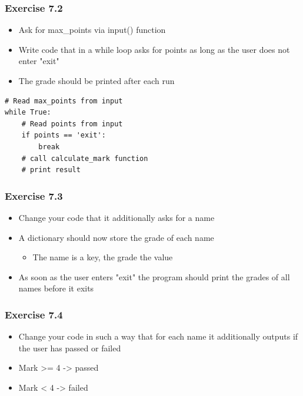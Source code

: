 \documentclass[10pt, a4paper]{beamer} %
\begin{document}
{\begin{frame}
\end{frame}
\begin{frame}\frametitle{Exercise 7.2}

    \begin{itemize}
        \item Ask for max\_points via input() function
        \item Write code that in a while loop asks for points as long as the user does not enter "exit"
        \item The grade should be printed after each run
    \end{itemize}

    {
    \mdseries
    \begin{lstlisting}
# Read max_points from input
while True:
    # Read points from input
    if points == 'exit':
        break
    # call calculate_mark function
    # print result
\end{lstlisting}
    }
\end{frame}
\begin{frame}\frametitle{Exercise 7.3}

    \begin{itemize}
        \item Change your code that it additionally asks for a name
        \item A dictionary should now store the grade of each name
              \begin{itemize}
                  \item The name is a key, the grade the value
              \end{itemize}
        \item As soon as the user enters "exit" the program should print the grades of all names before it exits
    \end{itemize}

\end{frame}
\begin{frame}\frametitle{Exercise 7.4}

    \begin{itemize}
        \item Change your code in such a way that for each name it additionally outputs if the user has passed or failed
        \item Mark >= 4 -> passed
        \item Mark < 4 -> failed
    \end{itemize}
\end{frame}

}
\end{document}
